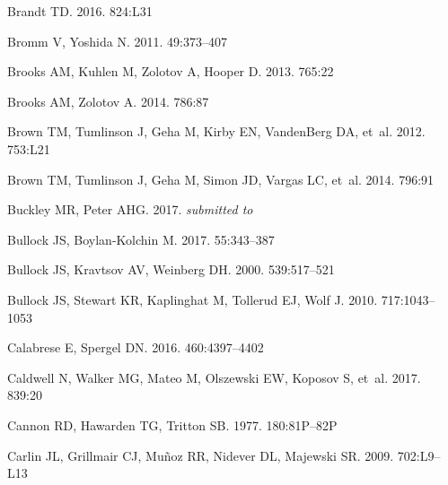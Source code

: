 \documentclass[a4paper]{ar-1col}
\begin{document}
\begin{thebibliography}{}
{Brandt} TD. 2016.
\textit{\apjl} 824:L31

{Bromm} V, {Yoshida} N. 2011.
\textit{\araa} 49:373--407

{Brooks} AM, {Kuhlen} M, {Zolotov} A, {Hooper} D. 2013.
\textit{\apj} 765:22

{Brooks} AM, {Zolotov} A. 2014.
\textit{\apj} 786:87

{Brown} TM, {Tumlinson} J, {Geha} M, {Kirby} EN, {VandenBerg} DA, et~al. 2012.
\textit{\apjl} 753:L21

{Brown} TM, {Tumlinson} J, {Geha} M, {Simon} JD, {Vargas} LC, et~al. 2014.
\textit{\apj} 796:91

{Buckley} MR, {Peter} AHG. 2017.
\textit{submitted to \physrep}

{Bullock} JS, {Boylan-Kolchin} M. 2017.
\textit{\araa} 55:343--387

{Bullock} JS, {Kravtsov} AV, {Weinberg} DH. 2000.
\textit{\apj} 539:517--521

{Bullock} JS, {Stewart} KR, {Kaplinghat} M, {Tollerud} EJ, {Wolf} J. 2010.
\textit{\apj} 717:1043--1053

{Calabrese} E, {Spergel} DN. 2016.
\textit{\mnras} 460:4397--4402

{Caldwell} N, {Walker} MG, {Mateo} M, {Olszewski} EW, {Koposov} S, et~al. 2017.
\textit{\apj} 839:20

{Cannon} RD, {Hawarden} TG, {Tritton} SB. 1977.
\textit{\mnras} 180:81P--82P

{Carlin} JL, {Grillmair} CJ, {Mu{\~n}oz} RR, {Nidever} DL, {Majewski} SR. 2009.
\textit{\apjl} 702:L9--L13


\end{thebibliography}
\end{document}
